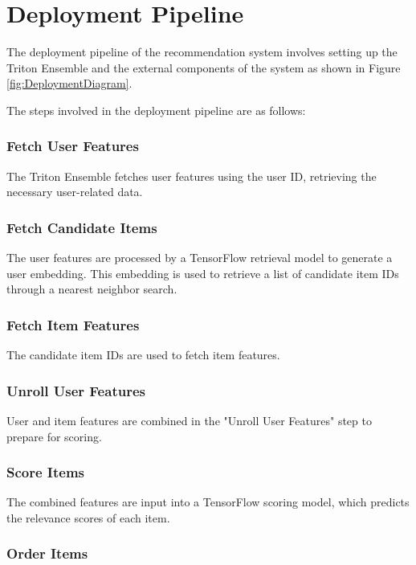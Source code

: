 \section{Deployment Pipeline}

The deployment pipeline of the recommendation system involves setting up the Triton Ensemble and the external components of the system as shown in Figure \ref{fig:DeploymentDiagram}.

The steps involved in the deployment pipeline are as follows:

\subsubsection{Fetch User Features}

The Triton Ensemble fetches user features using the user ID, retrieving the necessary user-related data.

\subsubsection{Fetch Candidate Items}

The user features are processed by a TensorFlow retrieval model to generate a user embedding. This embedding is used to retrieve a list of candidate item IDs through a nearest neighbor search.

\subsubsection{Fetch Item Features}

The candidate item IDs are used to fetch item features.

\subsubsection{Unroll User Features}

User and item features are combined in the "Unroll User Features" step to prepare for scoring.

\subsubsection{Score Items}

The combined features are input into a TensorFlow scoring model, which predicts the relevance scores of each item.

\subsubsection{Order Items}

